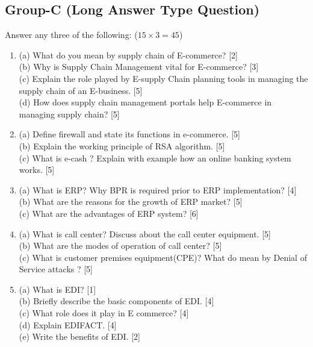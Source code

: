 \subsection*{Group-C (Long Answer Type Question)}
Answer any three of the following: ($15 \times 3 = 45$)
\begin{enumerate}
    \item[7.] 
    (a) What do you mean by supply chain of E-commerce? [2] \\
    (b) Why is Supply Chain Management vital for E-commerce? [3] \\
    (c) Explain the role played by E-supply Chain planning tools in managing the supply chain of an E-business. [5] \\
    (d) How does supply chain management portals help E-commerce in managing supply chain? [5]
    \item[8.] 
    (a) Define firewall and state its functions in e-commerce. [5] \\
    (b) Explain the working principle of RSA algorithm. [5] \\
    (c) What is e-cash ? Explain with example how an online banking system works. [5]
    \item[9.] 
    (a) What is ERP? Why BPR is required prior to ERP implementation? [4] \\
    (b) What are the reasons for the growth of ERP market? [5] \\
    (c) What are the advantages of ERP system? [6]
    \item[10.] 
    (a) What is call center? Discuss about the call center equipment. [5] \\
    (b) What are the modes of operation of call center? [5] \\
    (c) What is customer premises equipment(CPE)? What do mean by Denial of Service attacks ? [5]
    \item[11.] 
    (a) What is EDI? [1] \\
    (b) Briefly describe the basic components of EDI. [4] \\
    (c) What role does it play in E commerce? [4] \\
    (d) Explain EDIFACT. [4] \\
    (e) Write the benefits of EDI. [2]
\end{enumerate}